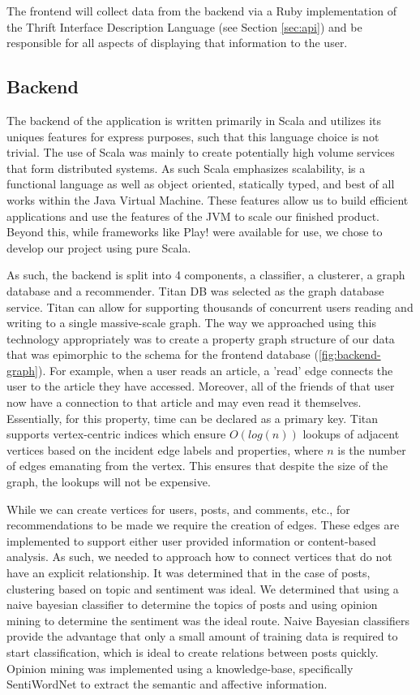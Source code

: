 \documentclass[11pt,letterpaper]{article}
\begin{document}
The frontend will collect data from the backend via a Ruby implementation of the Thrift Interface Description Language (see Section \ref{sec:api}) and be responsible for all aspects of displaying that information to the user.

\subsection{Backend}
The backend of the application is written primarily in Scala and utilizes its uniques features for express purposes, such that this language choice is not trivial. The use of Scala was mainly to create potentially high volume services that form distributed systems. As such Scala emphasizes scalability, is a functional language as well as object oriented, statically typed, and best of all works within the Java Virtual Machine. These features allow us to build efficient applications and use the features of the JVM to scale our finished product. Beyond this, while frameworks like Play! were available for use, we chose to develop our project using pure Scala.

As such, the backend is split into 4 components, a classifier, a clusterer, a graph database and a recommender. Titan DB was selected as the graph database service. Titan can allow for supporting thousands of concurrent users reading and writing to a single massive-scale graph. The way we approached using this technology appropriately was to create a property graph structure of our data that was epimorphic to the schema for the frontend database (\ref{fig:backend-graph}). For example, when a user reads an article, a 'read' edge connects the user to the article they have accessed. Moreover, all of the friends of that user now have a connection to that article and may even read it themselves. Essentially, for this property, time can be declared as a primary key. Titan supports vertex-centric indices which ensure $O(log(n))$ lookups of adjacent vertices based on the incident edge labels and properties, where $n$ is the number of edges emanating from the vertex. This ensures that despite the size of the graph, the lookups will not be expensive.

While we can create vertices for users, posts, and comments, etc., for recommendations to be made we require the creation of edges. These edges are implemented to support either user provided information or content-based analysis. As such, we needed to approach how to connect vertices that do not have an explicit relationship. It was determined that in the case of posts, clustering based on topic and sentiment was ideal. We determined that using a naive bayesian classifier to determine the topics of posts and using opinion mining to determine the sentiment was the ideal route. Naive Bayesian classifiers provide the advantage that only a small amount of training data is required to start classification, which is ideal to create relations between posts quickly. Opinion mining was implemented using a knowledge-base, specifically SentiWordNet to extract the semantic and affective information.
\end{document}
